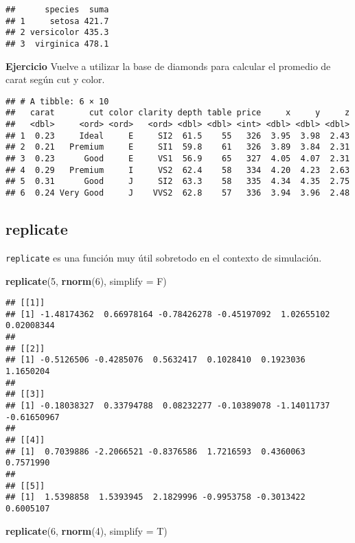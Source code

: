 \documentclass[]{article}
\newenvironment{Shaded}{\begin{snugshade}}{\end{snugshade}}
\newcommand{\KeywordTok}[1]{\textcolor[rgb]{0.13,0.29,0.53}{\textbf{{#1}}}}
\newcommand{\DataTypeTok}[1]{\textcolor[rgb]{0.13,0.29,0.53}{{#1}}}
\newcommand{\DecValTok}[1]{\textcolor[rgb]{0.00,0.00,0.81}{{#1}}}
\newcommand{\NormalTok}[1]{{#1}}
\begin{document}
\begin{verbatim}
##      species  suma
## 1     setosa 421.7
## 2 versicolor 435.3
## 3  virginica 478.1
\end{verbatim}

\textbf{Ejercicio} Vuelve a utilizar la base de diamonds para calcular
el promedio de carat según cut y color.

\begin{verbatim}
## # A tibble: 6 × 10
##   carat       cut color clarity depth table price     x     y     z
##   <dbl>     <ord> <ord>   <ord> <dbl> <dbl> <int> <dbl> <dbl> <dbl>
## 1  0.23     Ideal     E     SI2  61.5    55   326  3.95  3.98  2.43
## 2  0.21   Premium     E     SI1  59.8    61   326  3.89  3.84  2.31
## 3  0.23      Good     E     VS1  56.9    65   327  4.05  4.07  2.31
## 4  0.29   Premium     I     VS2  62.4    58   334  4.20  4.23  2.63
## 5  0.31      Good     J     SI2  63.3    58   335  4.34  4.35  2.75
## 6  0.24 Very Good     J    VVS2  62.8    57   336  3.94  3.96  2.48
\end{verbatim}

\subsection{replicate}\label{replicate}

\texttt{replicate} es una función muy útil sobretodo en el contexto de
simulación.

\begin{Shaded}
\begin{Highlighting}[]
\KeywordTok{replicate}\NormalTok{(}\DecValTok{5}\NormalTok{, }\KeywordTok{rnorm}\NormalTok{(}\DecValTok{6}\NormalTok{), }\DataTypeTok{simplify =} \NormalTok{F)}
\end{Highlighting}
\end{Shaded}

\begin{verbatim}
## [[1]]
## [1] -1.48174362  0.66978164 -0.78426278 -0.45197092  1.02655102  0.02008344
## 
## [[2]]
## [1] -0.5126506 -0.4285076  0.5632417  0.1028410  0.1923036  1.1650204
## 
## [[3]]
## [1] -0.18038327  0.33794788  0.08232277 -0.10389078 -1.14011737 -0.61650967
## 
## [[4]]
## [1]  0.7039886 -2.2066521 -0.8376586  1.7216593  0.4360063  0.7571990
## 
## [[5]]
## [1]  1.5398858  1.5393945  2.1829996 -0.9953758 -0.3013422  0.6005107
\end{verbatim}

\begin{Shaded}
\begin{Highlighting}[]
\KeywordTok{replicate}\NormalTok{(}\DecValTok{6}\NormalTok{, }\KeywordTok{rnorm}\NormalTok{(}\DecValTok{4}\NormalTok{), }\DataTypeTok{simplify =} \NormalTok{T)}
\end{Highlighting}
\end{Shaded}
\end{document}
